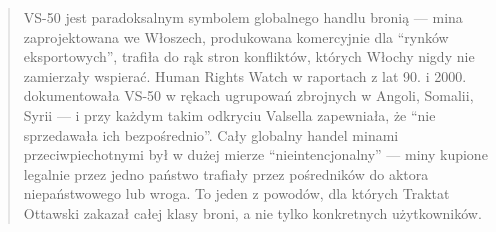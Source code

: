 \documentclass[12pt,oneside]{book}
\begin{document}
\begin{quote}
VS-50 jest paradoksalnym symbolem globalnego handlu bronią --- mina
zaprojektowana we Włoszech, produkowana komercyjnie dla ``rynków
eksportowych'', trafiła do rąk stron konfliktów, których Włochy nigdy
nie zamierzały wspierać. Human Rights Watch w raportach z lat 90. i
2000. dokumentowała VS-50 w rękach ugrupowań zbrojnych w Angoli,
Somalii, Syrii --- i przy każdym takim odkryciu Valsella zapewniała, że
``nie sprzedawała ich bezpośrednio''. Cały globalny handel minami
przeciwpiechotnymi był w dużej mierze ``nieintencjonalny'' --- miny
kupione legalnie przez jedno państwo trafiały przez pośredników do
aktora niepaństwowego lub wroga. To jeden z powodów, dla których Traktat
Ottawski zakazał całej klasy broni, a nie tylko konkretnych
użytkowników.
\end{quote}
\end{document}
